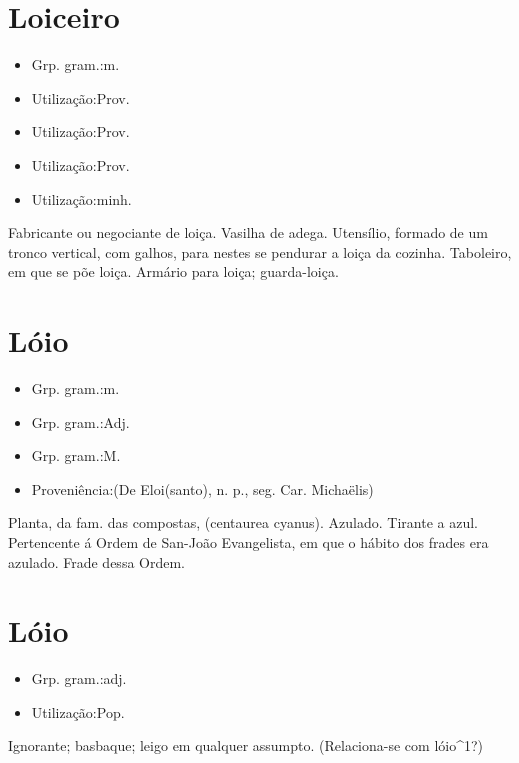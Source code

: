 \section{Loiceiro}
\begin{itemize}
\item {Grp. gram.:m.}
\end{itemize}
\begin{itemize}
\item {Utilização:Prov.}
\end{itemize}
\begin{itemize}
\item {Utilização:Prov.}
\end{itemize}
\begin{itemize}
\item {Utilização:Prov.}
\end{itemize}
\begin{itemize}
\item {Utilização:minh.}
\end{itemize}
Fabricante ou negociante de loiça.
Vasilha de adega.
Utensílio, formado de um tronco vertical, com galhos, para nestes se pendurar a loiça da cozinha.
Taboleiro, em que se põe loiça.
Armário para loiça; guarda-loiça.
\section{Lóio}
\begin{itemize}
\item {Grp. gram.:m.}
\end{itemize}
\begin{itemize}
\item {Grp. gram.:Adj.}
\end{itemize}
\begin{itemize}
\item {Grp. gram.:M.}
\end{itemize}
\begin{itemize}
\item {Proveniência:(De \textunderscore Eloi\textunderscore  (santo), n. p., seg. Car. Michaëlis)}
\end{itemize}
Planta, da fam. das compostas, (\textunderscore centaurea cyanus\textunderscore ).
Azulado.
Tirante a azul.
Pertencente á Ordem de San-João Evangelista, em que o hábito dos frades era azulado.
Frade dessa Ordem.
\section{Lóio}
\begin{itemize}
\item {Grp. gram.:adj.}
\end{itemize}
\begin{itemize}
\item {Utilização:Pop.}
\end{itemize}
Ignorante; basbaque; leigo em qualquer assumpto.
(Relaciona-se com \textunderscore lóio\textunderscore ^1?)
